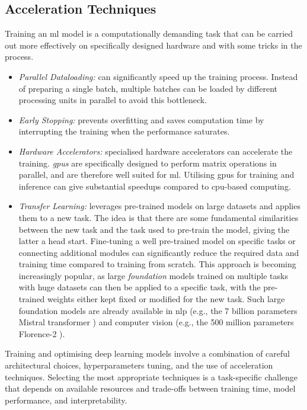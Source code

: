 \subsection{Acceleration Techniques}
Training an \gls{ml} model is a computationally demanding task that can be carried out more effectively on specifically designed hardware and with some tricks in the process. 
\begin{itemize}[leftmargin=*]
    \item \textit{Parallel Dataloading:} can significantly speed up the training process. Instead of preparing a single batch, multiple batches can be loaded by different processing units in parallel to avoid this bottleneck. 
    \item \textit{Early Stopping:} prevents overfitting and saves computation time by interrupting the training when the performance saturates.
    \item  \textit{Hardware Accelerators:} specialised hardware accelerators can accelerate the training. \textit{\glspl{gpu}} are specifically designed to perform matrix operations in parallel, and are therefore well suited for \gls{ml}. Utilising \glspl{gpu} for training and inference can give substantial speedups compared to \gls{cpu}-based computing. 
    \item \textit{Transfer Learning:} leverages pre-trained models on large datasets and applies them to a new task. The idea is that there are some fundamental similarities between the new task and the task used to pre-train the model, giving the latter a head start. Fine-tuning a well pre-trained model on specific tasks or connecting additional modules can significantly reduce the required data and training time compared to training from scratch. This approach is becoming increasingly popular, as large \textit{foundation} models trained on multiple tasks with huge datasets can then be applied to a specific task, with the pre-trained weights either kept fixed or modified for the new task. Such large foundation models are already available in \gls{nlp} (e.g., the 7 billion parameters Mistral transformer \cite{jiang2023mistral}) and computer vision (e.g., the 500 million parameters Florence-2 \cite{xiao2023florence2}).
\end{itemize}
Training and optimising deep learning models involve a combination of careful architectural choices, hyperparameters tuning, and the use of acceleration techniques. Selecting the most appropriate techniques is a task-specific challenge that depends on available resources and trade-offs between training time, model performance, and interpretability.
